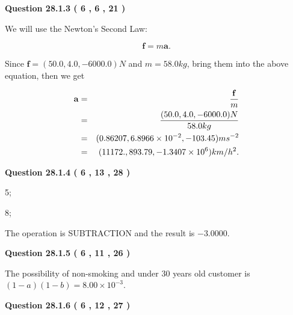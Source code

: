 \documentclass[12pt]{article}
\begin{document}
{\textbf{\Large{Question
28.1.3 
 (           6 ,           6 ,          21 )
}}}
  
  
 
 
\noindent{}

We will use the Newton's Second Law:
 
\[
\mathbf{f}=m\mathbf{a}.
\]
 
Since $\mathbf{f}=( %
50.0,  %
4.0,  %
-6000.0 )N$
and $m= %
58.0 kg$, bring them into the above equation, then we get
 
\begin{eqnarray*}
\mathbf{a}&=&\frac{\mathbf{f}}m  \\
&=&\frac{(
50.0 ,
4.0 ,
-6000.0 )N
}{ %
58.0 kg}  \\
&=&(
0.86207 ,
6.8966 \times 10^{-2},
-103.45
)ms^{-2} \\
&=&(
11172. ,
893.79 ,
-1.3407 \times 10^{6}
)km/h^2.
\end{eqnarray*}
 
 
 
  
\vspace{0.2in}
  
{\textbf{\Large{Question
28.1.4 
 (           6 ,          13 ,          28 )
}}}
  
  
 
 
\noindent{}

5;
 
8;
 
The operation is  %
SUBTRACTION and the result is
$ %
-3.0000$.
 
 
 
  
\vspace{0.2in}
  
{\textbf{\Large{Question
28.1.5 
 (           6 ,          11 ,          26 )
}}}
  
  
 
 
\noindent{}

The possibility of  %
 non-smoking and  %
under 30 years old
customer is $ (1-a)(1-b) =  %
8.00 \times 10^{-3} $.
 
 
  
\vspace{0.2in}
  
{\textbf{\Large{Question
28.1.6 
 (           6 ,          12 ,          27 )
}}}
  
\end{document}
